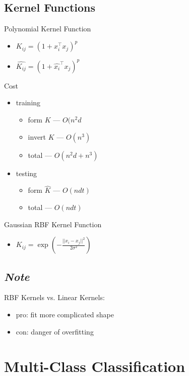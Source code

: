 \documentclass[10pt,landscape,a4paper]{article}
\begin{document}
\begin{multicols*}{5}
\subsection{Kernel Functions}
Polynomial Kernel Function
\begin{itemize}
    \item \(K_{ij} = (1+x_i^\intercal x_j)^p\)
    \item \(\hat{K_{ij}} = (1+\hat{x_i}^\intercal x_j)^p\)
\end{itemize}
Cost
\begin{itemize}
    \item training
    \begin{itemize}
        \item form \(K\) --- \(O(n^2d\)
        \item invert \(K\) --- \(O(n^3)\)
        \item total --- \(O(n^2d + n^3)\)
    \end{itemize}
    \item testing
    \begin{itemize}
        \item form \(\hat{K}\) --- \(O(ndt)\)
        \item total --- \(O(ndt)\)
    \end{itemize}
\end{itemize}
Gaussian RBF Kernel Function
\begin{itemize}
    \item \(K_{ij} = \exp(- \frac{||x_i-x_j||^2}{2\sigma^2})\)
\end{itemize}

\subsection{\emph{Note}}
RBF Kernels vs. Linear Kernels:
\begin{itemize}
    \item pro: fit more complicated shape
    \item con: danger of overfitting
\end{itemize}

\section{Multi-Class Classification}


\end{multicols*}
\end{document}
